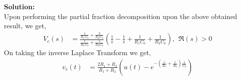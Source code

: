 \documentclass[journal,12pt,twocolumn]{IEEEtran}
\newcommand{\solution}{\noindent \textbf{Solution: }}
\numberwithin{equation}{section}
\numberwithin{figure}{section}
\renewcommand\thesection{\arabic{section}}
\begin{document}
\begin{enumerate}[label=\thesection.\arabic*.,ref=\thesection.\theenumi]
		\solution\\
			Upon performing the partial fraction decomposition upon the above obtained result, we get,
			\begin{align}
				V_c(s) & = \frac{\frac{1}{R_1C_0} + \frac{2}{R_2C_0}}{\frac{1}{R_1C_0} + \frac{1}{R_2C_0}}\left( \frac{1}{s} - \frac{1}{s} + \frac{1}{R_1C_0} + \frac{1}{R_2C_0} \right), \ \ \Re(s) > 0
			\end{align}
			On taking the inverse Laplace Transform we get,
			\begin{align}
				v_c(t) & = \frac{2R_1 + R_2}{R_1 + R_2}\left( u(t) - e^{-\left(\frac{1}{R_1} + \frac{1}{R_2}\right)\frac{1}{C_0}} \right)
			\end{align}
			
	\end{enumerate}
\end{document}

